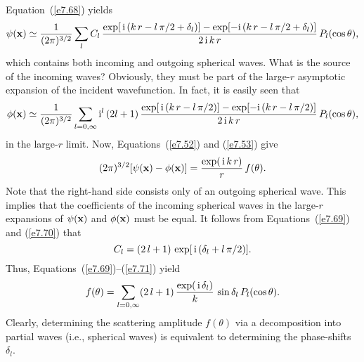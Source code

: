 Equation~(\ref{e7.68}) yields
\begin{equation}
\psi({\bf x}) \simeq \frac{1}{(2\pi)^{3/2}} \sum_l C_l\,
\frac{\exp[\,{\rm i}\,(k\,r - l\,\pi/2+ \delta_l)]
-\exp[-{\rm i}\,(k\,r - l\,\pi/2+ \delta_l)] }{2\,{\rm i}\,k\,r}\,  P_l(\cos\theta),\label{e7.69}
\end{equation}
which contains both incoming and outgoing spherical waves. What is the
source of the incoming waves? Obviously, they must be part of
the large-$r$ asymptotic expansion of the incident wavefunction. In fact,
it is easily seen that
\begin{equation}
\phi({\bf x}) \simeq \frac{1}{(2\pi)^{3/2}} \sum_{l=0,\infty} {\rm i}^l\,
(2l+1)\, \frac{
\exp[\,{\rm i}\,(k\,r - l\,\pi/2)]
-\exp[-{\rm i}\,(k\,r - l\,\pi/2)]}{2\,{\rm i}\,k\,r} \, P_l(\cos\theta),\label{e7.70}
\end{equation}
in the large-$r$ limit. Now, Equations~(\ref{e7.52}) and (\ref{e7.53}) give
\begin{equation}\label{e7.71}
(2\pi)^{3/2}[\psi({\bf x} )- \phi({\bf x})  ] = 
\frac{\exp(\,{\rm i}\,k\,r)}{r}\,
f(\theta).
\end{equation}
Note that the right-hand side consists only of an outgoing spherical
wave. This implies that the coefficients of the incoming spherical waves
in the large-$r$  expansions of $\psi({\bf x})$ and $\phi({\bf x})$
must be equal. It follows from Equations~(\ref{e7.69}) and (\ref{e7.70}) that
\begin{equation}
C_l = (2\,l+1)\,\exp[\,{\rm i}\,(\delta_l + l\,\pi/2)].
\end{equation} 
Thus, Equations~(\ref{e7.69})--(\ref{e7.71}) yield
\begin{equation}\label{e7.73}
f(\theta) = \sum_{l=0,\infty} (2\,l+1)\,\frac{\exp(\,{\rm i}\,\delta_l)}
{k} \,\sin\delta_l\,P_l(\cos\theta).
\end{equation}
Clearly, determining the scattering amplitude
$f(\theta)$  via  a decomposition into
partial waves ({\rm i.e.}, spherical waves) is equivalent to determining
the phase-shifts $\delta_l$.

